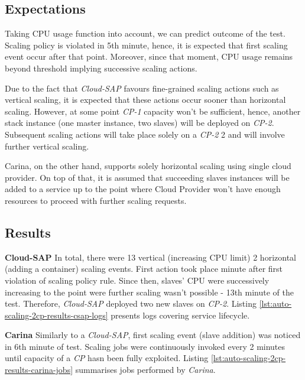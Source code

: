 \subsection*{Expectations}
Taking CPU usage function into account, we can predict outcome of the test. Scaling policy is violated in 5th minute, hence, it is expected that first scaling event occur after that point. Moreover, since that moment, CPU usage remains beyond threshold implying successive scaling actions.

Due to the fact that \emph{Cloud-SAP} favours fine-grained scaling actions such as vertical scaling, it is expected that these actions occur sooner than horizontal scaling. However, at some point \emph{CP-1} capacity won't be sufficient, hence, another stack instance (one master instance, two slaves) will be deployed on \emph{CP-2}. Subsequent scaling actions will take place solely on a \emph{CP-2} 2 and will involve further vertical scaling.

Carina, on the other hand, supports solely horizontal scaling using single cloud provider. On top of that, it is assumed that succeeding slaves instances will be added to a service up to the point where Cloud Provider won't have enough resources to proceed with further scaling requests.

\subsection*{Results}

\begin{asparaenum}

  \item[\textbf{Cloud-SAP}] 
   In total, there were 13 vertical (increasing CPU limit) 2 horizontal (adding a container) scaling events. First action took place minute after first violation of scaling policy rule. Since then, slaves' CPU were successively increasing to the point were further scaling wasn't possible - 13th minute of the test. Therefore, \emph{Cloud-SAP} deployed two new slaves on \emph{CP-2}. Listing \ref{lst:auto-scaling-2cp-results-csap-logs} presents logs covering service lifecycle. 
  
  \item[\textbf{Carina}] 
  Similarly to a \emph{Cloud-SAP}, first scaling event (slave addition) was noticed in 6th minute of test. Scaling jobs were continuously invoked every 2 minutes until capacity of a \emph{CP} hasn been fully exploited. Listing \ref{lst:auto-scaling-2cp-results-carina-jobs} summarises jobs performed by \emph{Carina}. 
\end{asparaenum}
  

